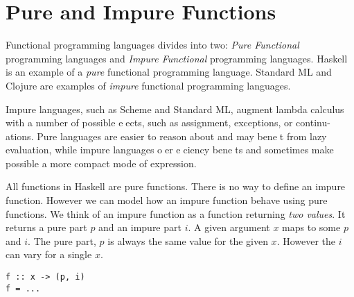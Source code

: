 \section{Pure and Impure Functions}

Functional programming languages divides into two: \textit{Pure Functional} programming languages 
and \textit{Impure Functional} programming languages. Haskell is an example of a \textit{pure} functional 
programming language. Standard ML and Clojure are examples of \textit{impure} functional programming languages.

Impure languages, such as Scheme and Standard ML, augment lambda calculus
with a number of possible eects, such as assignment, exceptions, or continu-
ations. Pure languages are easier to reason about and may benet from lazy
evaluation, while impure languages oer eciency benets and sometimes make
possible a more compact mode of expression.



All functions in Haskell are pure functions. There is no way to define an impure function.
However we can model how an impure function behave using pure functions. 
We think of an impure function as a function returning \textit{two values}. 
It returns a pure part $p$ and an impure part $i$. A given argument $x$ maps to some $p$ and $i$.
The pure part, $p$ is always the same value for the given $x$. However the $i$ can vary for a single $x$. 

\begin{lstlisting}
f :: x -> (p, i)
f = ...
\end{lstlisting}